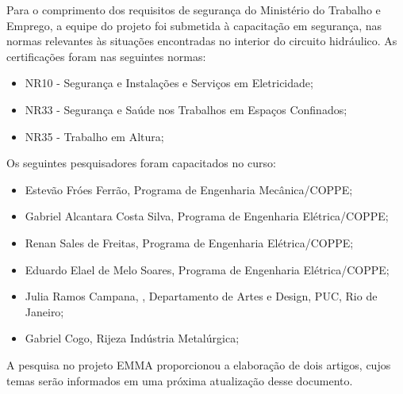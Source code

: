 Para o comprimento dos requisitos de segurança do Ministério do Trabalho e
Emprego, a equipe do projeto foi submetida à capacitação em segurança, nas
normas relevantes às situações encontradas no interior do circuito hidráulico. As certificações foram nas
seguintes normas:

\begin{itemize}
  \item NR10 - Segurança e Instalações e Serviços em Eletricidade;
  \item NR33 - Segurança e Saúde nos Trabalhos em Espaços Confinados;
  \item NR35 - Trabalho em Altura;
\end{itemize}

Os seguintes pesquisadores foram capacitados no curso:

\begin{itemize}
  \item Estevão Fróes Ferrão, Programa de Engenharia Mecânica/COPPE;
  \item Gabriel Alcantara Costa Silva, Programa de Engenharia Elétrica/COPPE;
  \item Renan Sales de Freitas, Programa de Engenharia Elétrica/COPPE;
  \item Eduardo Elael de Melo Soares, Programa de Engenharia Elétrica/COPPE;
  \item Julia Ramos Campana, , Departamento de Artes e Design, PUC, Rio de
  Janeiro;
  \item Gabriel Cogo, Rijeza Indústria Metalúrgica;
\end{itemize}

A pesquisa no projeto EMMA proporcionou a elaboração de dois artigos, cujos
temas serão informados em uma próxima atualização desse documento.


% 

